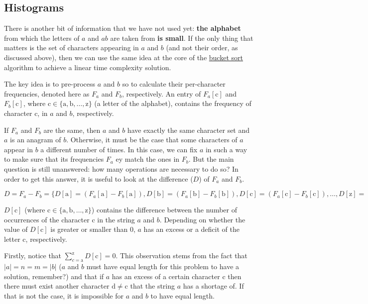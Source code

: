\subsection{Histograms}
\label{sec:anagrams:histograms}


There is another bit of information that we have not used yet: \textbf{the alphabet} from which the
letters of $a$ and $ab$ are taken from \textbf{is small}. 
If the only thing that matters is the set of characters appearing in $a$ and $b$ (and not their order, as discussed above),
then we can use the same idea at the core of the \href{https://en.wikipedia.org/wiki/Bucket_sort}{bucket sort} algorithm to achieve a linear time complexity solution.


The key idea is to pre-process $a$ and $b$ so to calculate their per-character frequencies, denoted here as $F_a$ and $F_b$, respectively.
An entry of $F_a[\mathrm{c}]$ and $F_b[\mathrm{c}]$, where $\mathrm{c} \in \{\mathrm{a},\mathrm{b},\ldots,\mathrm{z}\}$ (a letter of the alphabet), contains the frequency of character $\mathrm{c}$, in $a$ and $b$, respectively.


If $F_a$ and $F_b$ are the same, then $a$ and $b$ have exactly the same character set and $a$ is an anagram of $b$.
Otherwise, it must be the case that some characters of $a$ appear in $b$ a different number of times.
In this case, we can fix $a$ in such a way to make sure that its frequencies $F_a$ ey match the ones in $F_b$. 
But the main question is still unanswered: how many operations are necessary to do so?  In order to get this answer, it is useful to look at
the difference ($D$) of $F_a$ and $F_b$.

$D = F_a - F_b = \{D[\mathrm{a}] = (F_a[\mathrm{a}] - F_b[\mathrm{a}]), D[\mathrm{b}] = (F_a[\mathrm{b}] - F_b[\mathrm{b}]), D[\mathrm{c}] = (F_a[\mathrm{c}] - F_b[\mathrm{c}]), \ldots, D[\mathrm{z}] = (F_a[\mathrm{z}] - F_b[\mathrm{z}])\}
$

$D[\mathrm{c}]$ (where $\mathrm{c} \in \{\mathrm{a},\mathrm{b},\ldots,\mathrm{z}\}$) contains the difference between the number of occurrences of the character $\mathrm{c}$ in the string $a$ and $b$. Depending on whether the value of $D[\mathrm{c}]$  is greater or smaller than $0$, $a$ has an excess or a deficit of the letter c, respectively.

Firstly, notice that $\sum_{c=\mathrm{a}}^{\mathrm{z}} D[\mathrm{c}] = 0$. This observation stems from the fact that $|a|=n=m=|b|$ ($a$ and $b$ must have equal length for this problem to have a solution, remember?) and that if $a$ has an excess of a certain character $\mathrm{c}$ then there must exist another character $\mathrm{d} \neq \mathrm{c}$ that the string $a$ has a shortage of. If that is not the case, it is impossible for $a$ and $b$ to have equal length.

